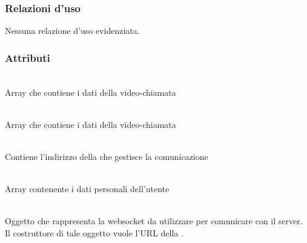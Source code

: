 \subsubsection*{Relazioni d'uso}
Nessuna relazione d'uso evidenziata.

\subsubsection*{Attributi}
\begin{description}
\item{}\\
Array che contiene i dati della video-chiamata
\item{}\\
Array che contiene i dati della video-chiamata
\item{}\\
Contiene l'indirizzo della  che gestisce la comunicazione
\item{}\\
Array contenente i dati personali dell'utente
\item{}\\
Oggetto che rappresenta la websocket da utilizzare per comunicare con il server. Il costruttore di tale oggetto vuole l'URL della .

\end{description}

